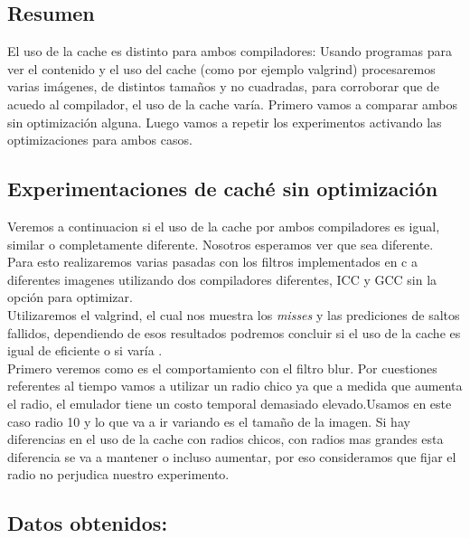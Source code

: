 \subsection{Resumen}

El uso de la cache es distinto para ambos compiladores: Usando programas para ver el contenido y el uso del cache (como por ejemplo valgrind) procesaremos varias imágenes, de distintos tamaños y no cuadradas, para corroborar que de acuedo al compilador, el uso de la cache varía. Primero vamos a comparar ambos sin optimización alguna. Luego vamos a repetir los experimentos activando las optimizaciones para ambos casos. \\


\subsection{Experimentaciones de caché sin optimización}

Veremos a continuacion si el uso de la cache por ambos compiladores es igual, similar o completamente diferente. Nosotros esperamos ver que sea diferente. Para esto realizaremos varias pasadas con los filtros implementados en c a diferentes imagenes utilizando dos compiladores diferentes, ICC y GCC sin la opción para optimizar. \\

Utilizaremos el valgrind, el cual nos muestra los \textit{misses} y las prediciones de saltos fallidos, dependiendo de esos resultados podremos concluir si el uso de la cache es igual de eficiente o si varía .\\


Primero veremos como es el comportamiento con el filtro blur. Por cuestiones referentes al tiempo vamos a utilizar un radio chico ya que a medida que aumenta el radio, el emulador tiene un costo temporal demasiado elevado.Usamos en este caso radio 10 y lo que va a ir variando es el tamaño de la imagen. Si hay diferencias en el uso de la cache con radios chicos, con radios mas grandes esta diferencia se va a mantener o incluso aumentar, por eso consideramos que fijar el radio no perjudica nuestro experimento. \\

\subsection{Datos obtenidos:}

